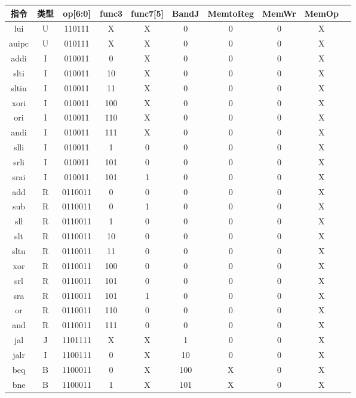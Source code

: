 \documentclass[12pt, a4paper]{ctexart}
\begin{document}
\begin{table}[H]
    \centering
    \small
    \begin{tabular}{cccccccccc}
        \hline
        指令 & 类型 & op[6:0] & func3 & func7[5] & BandJ & MemtoReg & MemWr & MemOp \\
        \hline
        lui & U & 110111 & X & X & 0 & 0 & 0 & X \\
        auipc & U & 010111 & X & X & 0 & 0 & 0 & X \\
        addi & I & 010011 & 0 & X & 0 & 0 & 0 & X \\
        slti & I & 010011 & 10 & X & 0 & 0 & 0 & X \\
        sltiu & I & 010011 & 11 & X & 0 & 0 & 0 & X \\
        xori & I & 010011 & 100 & X & 0 & 0 & 0 & X \\
        ori & I & 010011 & 110 & X & 0 & 0 & 0 & X \\
        andi & I & 010011 & 111 & X & 0 & 0 & 0 & X \\
        slli & I & 010011 & 1 & 0 & 0 & 0 & 0 & X \\
        srli & I & 010011 & 101 & 0 & 0 & 0 & 0 & X \\
        srai & I & 010011 & 101 & 1 & 0 & 0 & 0 & X \\
        add & R & 0110011 & 0 & 0 & 0 & 0 & 0 & X \\
        sub & R & 0110011 & 0 & 1 & 0 & 0 & 0 & X \\
        sll & R & 0110011 & 1 & 0 & 0 & 0 & 0 & X \\
        slt & R & 0110011 & 10 & 0 & 0 & 0 & 0 & X \\
        sltu & R & 0110011 & 11 & 0 & 0 & 0 & 0 & X \\
        xor & R & 0110011 & 100 & 0 & 0 & 0 & 0 & X \\
        srl & R & 0110011 & 101 & 0 & 0 & 0 & 0 & X \\
        sra & R & 0110011 & 101 & 1 & 0 & 0 & 0 & X \\
        or & R & 0110011 & 110 & 0 & 0 & 0 & 0 & X \\
        and & R & 0110011 & 111 & 0 & 0 & 0 & 0 & X \\
        jal & J & 1101111 & X & X & 1 & 0 & 0 & X \\
        jalr & I & 1100111 & 0 & X & 10 & 0 & 0 & X \\
        beq & B & 1100011 & 0 & X & 100 & X & 0 & X \\
        bne & B & 1100011 & 1 & X & 101 & X & 0 & X \\

\end{tabular}
\end{table}
\end{document}
